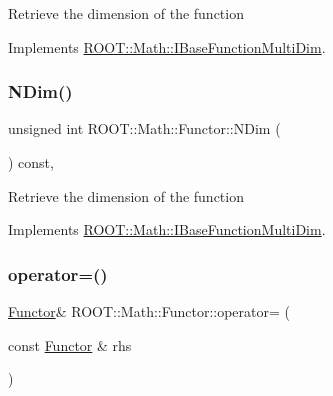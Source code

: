 Retrieve the dimension of the function 

Implements \mbox{\hyperlink{classROOT_1_1Math_1_1IBaseFunctionMultiDim_a16f37dc7a6d00c75ddeda0697741315d}{R\+O\+O\+T\+::\+Math\+::\+I\+Base\+Function\+Multi\+Dim}}.

\mbox{\label{classROOT_1_1Math_1_1Functor_a2544e2ed3c6a0420084c7b08eb3c3130}} 
\subsubsection{\texorpdfstring{NDim()}{NDim()}\hspace{0.1cm}{\footnotesize\ttfamily [2/2]}}
{\footnotesize\ttfamily unsigned int R\+O\+O\+T\+::\+Math\+::\+Functor\+::\+N\+Dim (\begin{DoxyParamCaption}{ }\end{DoxyParamCaption}) const\hspace{0.3cm}{\ttfamily [inline]}, {\ttfamily [virtual]}}

Retrieve the dimension of the function 

Implements \mbox{\hyperlink{classROOT_1_1Math_1_1IBaseFunctionMultiDim_a16f37dc7a6d00c75ddeda0697741315d}{R\+O\+O\+T\+::\+Math\+::\+I\+Base\+Function\+Multi\+Dim}}.

\mbox{\label{classROOT_1_1Math_1_1Functor_a24bd9cdf7e31e443bff64c5fb4378c99}} 
\subsubsection{\texorpdfstring{operator=()}{operator=()}\hspace{0.1cm}{\footnotesize\ttfamily [1/2]}}
{\footnotesize\ttfamily \mbox{\hyperlink{classROOT_1_1Math_1_1Functor}{Functor}}\& R\+O\+O\+T\+::\+Math\+::\+Functor\+::operator= (\begin{DoxyParamCaption}\item[{const \mbox{\hyperlink{classROOT_1_1Math_1_1Functor}{Functor}} \&}]{rhs }\end{DoxyParamCaption})\hspace{0.3cm}{\ttfamily [inline]}}

